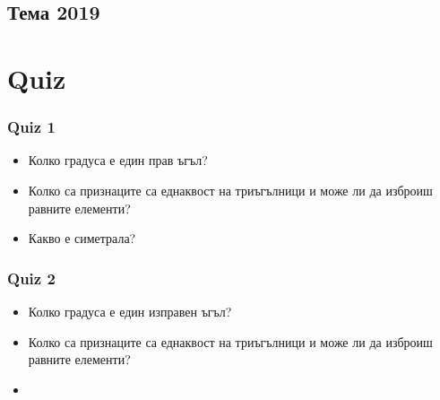 \documentclass{article}
\theoremstyle{plain}
\begin{document}
\subsection{Тема 2019}



\newpage
\section{Quiz}

\subsubsection{Quiz 1}
\begin{itemize}
	\item Колко градуса е един прав ъгъл?
	\item Колко са признаците са еднаквост на триъгълници и може ли да изброиш равните елементи?
	\item Какво е симетрала?
\end{itemize}


\subsubsection{Quiz 2}
\begin{itemize}
	\item Колко градуса е един изправен ъгъл?
	\item Колко са признаците са еднаквост на триъгълници и може ли да изброиш равните елементи?
	\item 
\end{itemize}
\end{document}
